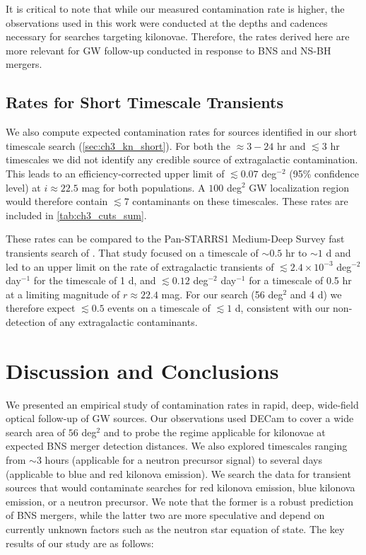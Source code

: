 It is critical to note that while our measured contamination rate is higher, the observations used in this work were conducted at the depths and cadences necessary for searches targeting kilonovae. Therefore, the rates derived here are more relevant for GW follow-up conducted in response to BNS and NS-BH mergers.

\subsection{Rates for Short Timescale Transients}
\label{sec:ch3_rates_short}

We also compute expected contamination rates for sources identified in our short timescale search (\cref{sec:ch3_kn_short}). For both the $\approx 3-24$ hr and $\lesssim 3$ hr timescales we did not identify any credible source of extragalactic contamination. This leads to an efficiency-corrected upper limit of $\lesssim 0.07$ deg$^{-2}$ (95\% confidence level) at $i\approx 22.5$ mag for both populations. A $100$ deg$^2$ GW localization region would therefore contain $\lesssim 7$ contaminants on these timescales. These rates are included in \cref{tab:ch3_cuts_sum}.

These rates can be compared to the Pan-STARRS1 Medium-Deep Survey fast transients search of \cite{Berger+13}. That study focused on a timescale of $\sim 0.5$ hr to $\sim 1$ d and led to an upper limit on the rate of extragalactic transients of $\lesssim 2.4\times 10^{-3}$ deg$^{-2}$ day$^{-1}$ for the timescale of 1 d, and $\lesssim 0.12$ deg$^{-2}$ day$^{-1}$ for a timescale of 0.5 hr at a limiting magnitude of $r\approx 22.4$ mag. For our search (56 deg$^2$ and 4 d) we therefore expect $\lesssim 0.5$ events on a timescale of $\lesssim 1$ d, consistent with our non-detection of any extragalactic contaminants.

\section{Discussion and Conclusions}
\label{sec:ch3_conc}
We presented an empirical study of contamination rates in rapid, deep, wide-field optical follow-up of GW sources. Our observations used DECam to cover a wide search area of $56$ deg$^2$ and to probe the regime applicable for kilonovae at expected BNS merger detection distances.  We also explored timescales ranging from $\sim 3$ hours (applicable for a neutron precursor signal) to several days (applicable to blue and red kilonova emission). We search the data for transient sources that would contaminate searches for red kilonova emission, blue kilonova emission, or a neutron precursor.  We note that the former is a robust prediction of BNS mergers, while the latter two are more speculative and depend on currently unknown factors such as the neutron star equation of state. The key results of our study are as follows:

